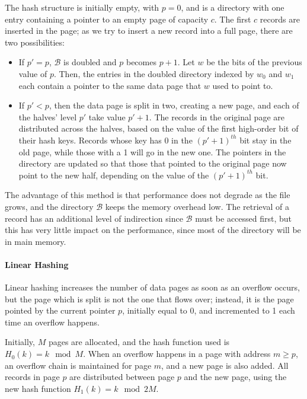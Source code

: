 The hash structure is initially empty, with $p=0$, and is a directory with one entry containing a pointer to an empty page of capacity $c$. The first $c$ records are inserted in the page; as we try to insert a new record into a full page, there are two possibilities:
\begin{itemize}
    \item If $p' = p$, $\mathcal{B}$ is doubled and $p$ becomes $p+1$. Let $w$ be the bits of the previous value of $p$. Then, the entries in the doubled directory indexed by $w_0$ and $w_1$ each contain a pointer to the same data page that $w$ used to point to.

    \item If $p' < p$, then the data page is split in two, creating a new page, and each of the halves' level $p'$ take value $p'+1$. The records in the original page are distributed across the halves, based on the value of the first high-order bit of their hash keys. Records whose key has 0 in the $(p'+1)^{th}$ bit stay in the old page, while those with a 1 will go in the new one. The pointers in the directory are updated so that those that pointed to the original page now point to the new half, depending on the value of the $(p'+1)^{th}$ bit.
\end{itemize}
The advantage of this method is that performance does not degrade as the file grows, and the directory $\mathcal{B}$ keeps the memory overhead low. The retrieval of a record has an additional level of indirection since $\mathcal{B}$ must be accessed first, but this has very little impact on the performance, since most of the directory will be in main memory.

\paragraph{Linear Hashing}

Linear hashing increases the number of data pages as soon as an overflow occurs, but the page which is split is not the one that flows over; instead, it is the page pointed by the current pointer $p$, initially equal to 0, and incremented to 1 each time an overflow happens.

Initially, $M$ pages are allocated, and the hash function used is $H_0(k) = k \mod M$. When an overflow happens in a page with address $m \geq p$, an overflow chain is maintained for page $m$, and a new page is also added. All records in page $p$ are distributed between page $p$ and the new page, using the new hash function $H_1(k) = k \mod 2M$.

